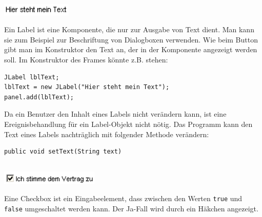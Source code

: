 \begin{minipage}{0.2\textwidth}
\subsection{}
\end{minipage}
\begin{minipage}{0.8\textwidth}
\includegraphics[width=0.25\textwidth]{./inf/SEKII/24_Java_GUI-Komponenten/JLabel.png}
\end{minipage}

Ein Label ist eine Komponente, die nur zur Ausgabe von Text dient. Man kann sie
zum Beispiel zur Beschriftung von Dialogboxen verwenden. Wie beim Button gibt
man im Konstruktor den Text an, der in der Komponente angezeigt werden soll. Im
Konstruktor des Frames könnte z.B. stehen:

\begin{lstlisting}
JLabel lblText;
lblText = new JLabel("Hier steht mein Text");
panel.add(lblText);
\end{lstlisting}

Da ein Benutzer den Inhalt eines Labels nicht verändern kann, ist eine
Ereignisbehandlung für ein Label-Objekt nicht nötig. Das Programm kann den Text
eines Labels nachträglich mit folgender Methode verändern:

\begin{lstlisting}
public void setText(String text)
\end{lstlisting}

\begin{minipage}{0.2\textwidth}
\subsection{}
\end{minipage}
\begin{minipage}{0.8\textwidth}
\includegraphics[width=0.35\textwidth]{./inf/SEKII/24_Java_GUI-Komponenten/JCheckBox.png}
\end{minipage}
		
Eine Checkbox ist ein Eingabeelement, dass zwischen den Werten \lstinline|true|
und \lstinline|false| umgeschaltet werden kann. Der Ja-Fall wird durch ein
Häkchen angezeigt.

